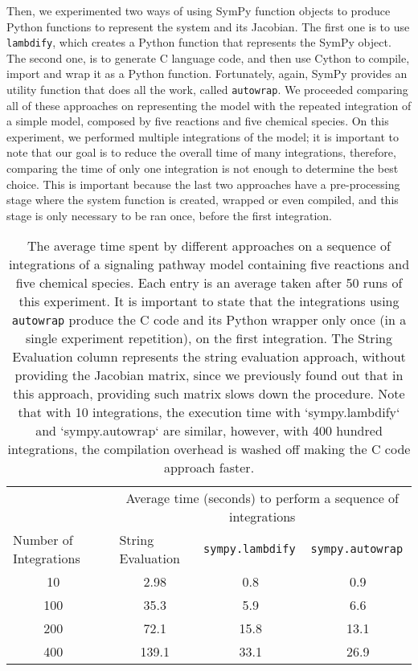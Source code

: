 Then, we experimented two ways of using SymPy function objects to 
produce Python functions to represent the system and its Jacobian. The 
first one is to use {\tt lambdify}, which creates a Python function that 
represents  the SymPy object. The second one, is to generate C language 
code, and then use Cython to compile, import and wrap it as a Python 
function. Fortunately, again, SymPy provides an utility function that 
does all the work, called {\tt autowrap}. We proceeded comparing all of 
these approaches on representing the model with the repeated integration 
of a simple model, composed by five reactions and five chemical species. 
On this experiment, we performed multiple integrations of the model; it 
is important to note that our goal is to reduce the overall time of many
integrations, therefore, comparing the time of only one integration is
not enough to determine the best choice. This is important because the
last two approaches have a pre-processing stage where the system
function is created, wrapped or even compiled, and this stage is only
necessary to be ran once, before the first integration.

\begin{table}[]
\centering
\begin{tabular}{c c ccc}
\hline
\multicolumn{1}{l}{} 
&& \multicolumn{3}{c}{Average time (seconds) to perform a sequence of 
    integrations} \\
\multicolumn{1}{l}{Number of Integrations}               
&& \multicolumn{1}{l}{String Evaluation} 
& \multicolumn{1}{l}{{\tt sympy.lambdify}} 
& \multicolumn{1}{l}{{\tt sympy.autowrap}} \\ \hline 
    10  &&   2.98    & 0.8   & 0.9 \\
    100 && 35.3      & 5.9   & 6.6 \\ 
    200 && 72.1      & 15.8  & 13.1 \\
    400 && 139.1     & 33.1  & 26.9 \\
\hline \hline
\end{tabular}
\caption{The average time spent by different approaches on a sequence of
integrations of a signaling pathway model containing five reactions and
five chemical species. Each entry is an average taken after 50 runs of 
this experiment. It is important to state that the integrations using 
{\tt autowrap} produce the C code and its Python wrapper only once (in a
single experiment repetition), on the first integration. The String
Evaluation column represents the string evaluation approach, without
providing the Jacobian matrix, since we previously found out that in
this approach, providing such matrix slows down the procedure. Note that
with 10 integrations, the execution time with `sympy.lambdify` and
`sympy.autowrap` are similar, however, with 400 hundred integrations,
the compilation overhead is washed off making the C code approach
faster.}
\label{tab:system_representation_experiment}
\end{table}

